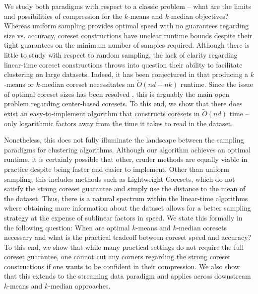 We study both paradigms with respect to a classic problem -- what are the limits and possibilities of compression for the $k$-means and $k$-median objectives?
Whereas uniform sampling provides optimal speed with no guarantees regarding size vs. accuracy, coreset constructions have
unclear runtime bounds despite their tight guarantees on the minimum number of samples required. Although there is little to study with respect to random
sampling, the lack of clarity regarding linear-time coreset constructions throws into question their ability to facilitate clustering on large datasets.
Indeed, it has been conjectured in \cite{DSWY22} that producing a $k$-means or $k$-median coreset necessitates an $\tilde{O}(nd + nk)$ runtime.
Since the issue of optimal coreset sizes has been resolved \cite{CSS21,CLSSS22,HLW23}, this is arguably the main open problem regarding center-based coresets. To this end, we show that
there does exist an easy-to-implement algorithm that constructs coresets in $\tilde{O}(nd)$ time -- only logarithmic factors away from the time it takes to read
in the dataset.

Nonetheless, this does not fully illuminate the landscape between the sampling paradigms for clustering algorithms. Although our algorithm achieves an optimal
runtime, it is certainly possible that other, cruder methods are equally viable in practice despite being faster and easier to implement. Other than uniform
sampling, this includes methods such as Lightweight Coresets, which do not satisfy the strong coreset guarantee and simply use the distance to the mean
of the dataset. Thus, there is a natural spectrum within the linear-time algorithms where obtaining more information about the dataset allows for a better
sampling strategy at the expense of sublinear factors in speed. We state this formally in the following question: When are optimal $k$-means and $k$-median
coresets necessary and what is the practical tradeoff between coreset speed and accuracy? To this end, we show that while many practical settings do not require
the full coreset guarantee, one cannot cut any corners regarding the strong coreset constructions if one wants to be confident in their compression. We also
show that this extends to the streaming data paradigm and applies across downstream $k$-means and $k$-median approaches.
